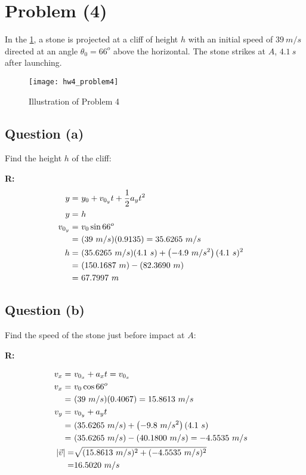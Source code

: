 \section{Problem (4)}

	In the \cref{fig:hw4_problem4}, a stone is projected at a cliff of height $h$ with an initial speed of $39 \ m/s$ directed at an angle $\theta_{0} = 66^{o}$ above the horizontal. The stone strikes at $A$, $4.1 \ s$ after launching.

	\begin{figure}[H]
		\begin{center}
			\texttt{[image: hw4\_problem4]}
			\caption{Illustration of Problem 4}
			\label{fig:hw4_problem4}
		\end{center}
	\end{figure}

	\subsection{Question (a)}
		Find the height $h$ of the cliff:

		\textbf{R:} \newline
		\begin{align}
			y = \ &y_{0} + v_{0_{y}}t + \frac{1}{2}a_{y}t^{2}& \notag \\
			y = \ &h& \notag \\
			v_{0_{y}} = \ &v_{0} \sin 66^{o}& \notag \\
			= \ &(39 \ m/s)(0.9135) = 35.6265 \ m/s& \notag \\
			h = \ &(35.6265 \ m/s)(4.1 \ s) + \left(-4.9 \ m/s^{2}\right)(4.1 \ s)^{2}& \notag \\
			= \ &(150.1687 \ m) - (82.3690 \ m)& \notag \\
			= \ &67.7997 \ m&
		\end{align}

	\subsection{Question (b)}
		Find the speed of the stone just before impact at $A$:

		\textbf{R:} \newline

		\begin{align}
			v_{x} = \ &v_{0_{x}} + a_{x}t = v_{0_{x}}& \notag \\
			v_{x} = \ &v_{0} \cos 66^{o}& \notag \\
			= \ &(39 \ m/s)(0.4067) = 15.8613 \ m/s& \notag \\
			v_{y} = \ &v_{0_{y}} + a_{y}t& \notag \\
			= \ &(35.6265 \ m/s) + \left( -9.8 \ m/s^{2} \right)(4.1 \ s)& \notag \\
			= \ &(35.6265 \ m/s) - (40.1800 \ m/s) = - 4.5535 \ m/s& \notag \\
			\left| \vec{v} \right| = &\sqrt{(15.8613 \ m/s)^{2} + (-4.5535 \ m/s)^{2}}& \notag \\
			= &16.5020 \ m/s&
		\end{align}

